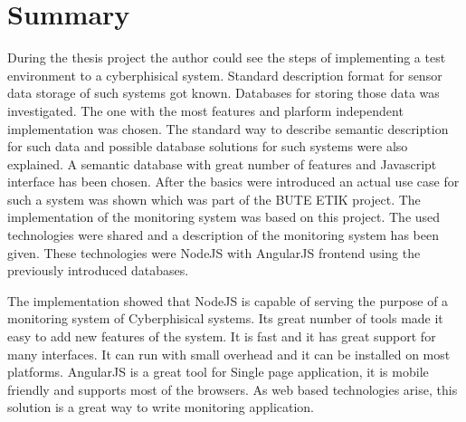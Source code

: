 \chapter{Summary}

During the thesis project the author could see the steps of implementing a test environment to a cyberphisical system. Standard description format for sensor data storage of such systems got known. Databases for storing those data was investigated. The one with the most features and plarform independent implementation was chosen. The standard way to describe semantic description for such data and possible database solutions for such systems were also explained. A semantic database with great number of features and Javascript interface has been chosen. After the basics were introduced an actual use case for such a system was shown which was part of the BUTE ETIK project. The implementation of the monitoring system was based on this project. The used technologies were shared and a description of the monitoring system has been given. These technologies were NodeJS with AngularJS frontend using the previously introduced databases. 

The implementation showed that NodeJS is capable of serving the purpose of a monitoring system of Cyberphisical systems. Its great number of tools made it easy to add new features of the system. It is fast and it has great support for many interfaces. It can run with small overhead and it can be installed on most platforms. AngularJS is a great tool for Single page application, it is mobile friendly and supports most of the browsers. As web based technologies arise, this solution is a great way to write monitoring application. 

